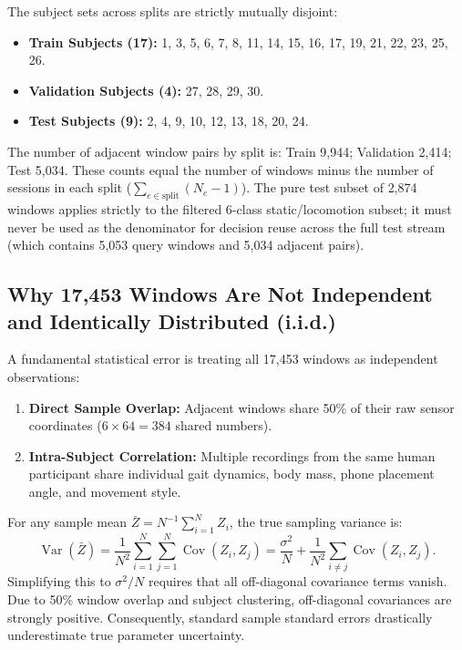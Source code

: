 \documentclass[11pt,a4paper]{article}
\theoremstyle{definition}
\begin{document}
The subject sets across splits are strictly mutually disjoint:
\begin{itemize}
\item \textbf{Train Subjects (17):} 1, 3, 5, 6, 7, 8, 11, 14, 15, 16, 17, 19, 21, 22, 23, 25, 26.
\item \textbf{Validation Subjects (4):} 27, 28, 29, 30.
\item \textbf{Test Subjects (9):} 2, 4, 9, 10, 12, 13, 18, 20, 24.
\end{itemize}

The number of adjacent window pairs by split is: Train 9,944; Validation 2,414; Test 5,034. These counts equal the number of windows minus the number of sessions in each split ($\sum_{e \in \text{split}} (N_e - 1)$). The pure test subset of 2,874 windows applies strictly to the filtered 6-class static/locomotion subset; it must never be used as the denominator for decision reuse across the full test stream (which contains 5,053 query windows and 5,034 adjacent pairs).

\subsection{Why 17,453 Windows Are Not Independent and Identically Distributed (i.i.d.)}
A fundamental statistical error is treating all 17,453 windows as independent observations:
\begin{enumerate}
\item \textbf{Direct Sample Overlap:} Adjacent windows share 50\% of their raw sensor coordinates ($6 \times 64 = 384$ shared numbers).
\item \textbf{Intra-Subject Correlation:} Multiple recordings from the same human participant share individual gait dynamics, body mass, phone placement angle, and movement style.
\end{enumerate}

For any sample mean $\bar{Z} = N^{-1} \sum_{i=1}^N Z_i$, the true sampling variance is:
\begin{equation}
\operatorname{Var}(\bar{Z}) = \frac{1}{N^2} \sum_{i=1}^N \sum_{j=1}^N \operatorname{Cov}(Z_i, Z_j) = \frac{\sigma^2}{N} + \frac{1}{N^2} \sum_{i \ne j} \operatorname{Cov}(Z_i, Z_j).
\end{equation}
Simplifying this to $\sigma^2 / N$ requires that all off-diagonal covariance terms vanish. Due to 50\% window overlap and subject clustering, off-diagonal covariances are strongly positive. Consequently, standard sample standard errors drastically underestimate true parameter uncertainty.
\end{document}
